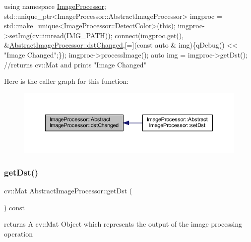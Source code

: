 \begin{DoxyCode}
\textcolor{keyword}{using namespace }\hyperlink{namespace_image_processor}{ImageProcessor};
std::unique\_ptr<ImageProcessor::AbstractImageProcessor> imgproc = 
      std::make\_unique<ImageProcessor::DetectColor>(\textcolor{keyword}{this});
imgproc->setImg(cv::imread(IMG\_PATH));
connect(imgproc.get(), &\hyperlink{class_image_processor_1_1_abstract_image_processor_ab42f4411848b924971026c104b9a5342}{AbstractImageProcessor::dstChanged},[=](\textcolor{keyword}{const} \textcolor{keyword}{auto}
      & img)\{qDebug() << \textcolor{stringliteral}{"Image Changed"};\});
imgproc->processImage();
\textcolor{keyword}{auto} img = imgproc->getDst(); \textcolor{comment}{//returns cv::Mat and prints "Image Changed"}
\end{DoxyCode}
 Here is the caller graph for this function\+:\nopagebreak
\begin{figure}[H]
\begin{center}
\leavevmode
\includegraphics[width=350pt]{dc/d61/class_image_processor_1_1_abstract_image_processor_ab42f4411848b924971026c104b9a5342_icgraph}
\end{center}
\end{figure}
\mbox{\label{class_image_processor_1_1_abstract_image_processor_acbf98498ebece7b9f339222097a3429a}} 
\subsubsection{\texorpdfstring{get\+Dst()}{getDst()}}
{\footnotesize\ttfamily cv\+::\+Mat Abstract\+Image\+Processor\+::get\+Dst (\begin{DoxyParamCaption}{ }\end{DoxyParamCaption}) const}



returns A cv\+::\+Mat Object which represents the output of the image processing operation 

